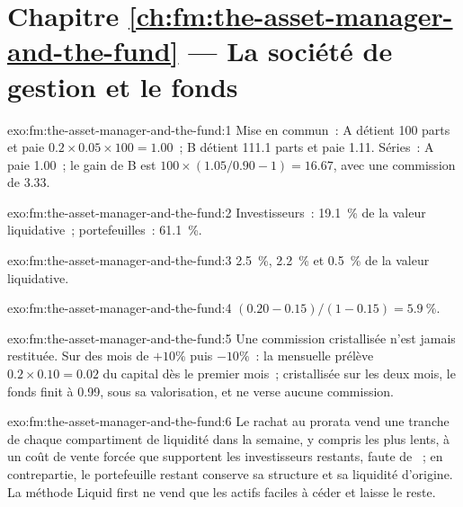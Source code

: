 \section*{Chapitre \ref{ch:fm:the-asset-manager-and-the-fund} --- La société de gestion et le fonds}

\begin{solution}{exo:fm:the-asset-manager-and-the-fund:1}
Mise en commun~: A détient 100 parts et paie $0.2\times0.05\times100=1.00$~; B détient 111.1 parts et paie 1.11. Séries~: A paie 1.00~; le gain de B est
$100\times(1.05/0.90-1)=16.67$, avec une commission de 3.33.
\end{solution}

\begin{solution}{exo:fm:the-asset-manager-and-the-fund:2}
Investisseurs~: 19.1~\% de la valeur liquidative~; portefeuilles~: 61.1~\%.
\end{solution}

\begin{solution}{exo:fm:the-asset-manager-and-the-fund:3}
2.5~\%, 2.2~\% et 0.5~\% de la valeur liquidative.
\end{solution}

\begin{solution}{exo:fm:the-asset-manager-and-the-fund:4}
$(0.20-0.15)/(1-0.15)=5.9~\%$.
\end{solution}

\begin{solution}{exo:fm:the-asset-manager-and-the-fund:5}
Une commission cristallisée n'est jamais restituée. Sur des mois de $+10\%$ puis $-10\%$~: la  mensuelle prélève $0.2\times0.10=0.02$ du capital dès le
premier mois~; cristallisée sur les deux mois, le fonds finit à 0.99, sous sa valorisation, et ne verse aucune commission.
\end{solution}

\begin{solution}{exo:fm:the-asset-manager-and-the-fund:6}
Le rachat au prorata vend une tranche de chaque compartiment de liquidité dans la semaine, y compris les plus lents, à un coût de vente forcée que supportent les investisseurs restants, faute de ~;
en contrepartie, le portefeuille restant conserve sa structure et sa liquidité d'origine. La méthode Liquid first ne vend que les actifs faciles à céder et laisse le reste.
\end{solution}

